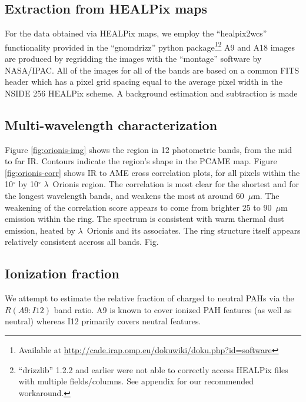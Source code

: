 		\subsection{Extraction from HEALPix maps}
		  For the data obtained via HEALPix maps, we employ the ``healpix2wcs'' functionality provided in the ``gnomdrizz'' python package\footnote{Available at \url{http://cade.irap.omp.eu/dokuwiki/doku.php?id=software}}\footnote{``drizzlib'' 1.2.2 and earlier were not able to correctly access HEALPix files with multiple fields/columns. See appendix for our recommended workaround.} A9 and A18 images are produced by regridding the images with the ``montage'' software by NASA/IPAC. All of the images for all of the bands are based on a common FITS header which has a pixel grid spacing equal to the average pixel width in the NSIDE 256 HEALPix scheme.
      A background estimation and subtraction is made

		\subsection{Multi-wavelength characterization}
			Figure \ref{fig:orionis-img} shows the region in 12 photometric bands, from the mid to far IR. Contours indicate the region's shape in the PCAME map. Figure \ref{fig:orionis-corr} shows IR to AME cross correlation plots, for all pixels within the 10$^{\circ}$ by 10$^{\circ}$ $\lambda$~Orionis region. The correlation is most clear for the shortest and for the longest wavelength bands, and weakens the most at around 60~$\mu$m. The weakening of the correlation score appears to come from brighter 25 to 90~$\mu$m emission within the ring. The spectrum is consistent with warm thermal dust emission, heated by $\lambda$~Orionis and its associates. The ring structure itself appears relatively consistent accross all bands. Fig. \

		\subsection{Ionization fraction}
			We attempt to estimate the relative fraction of charged to neutral PAHs via the $R(A9:I12)$ band ratio. A9 is known to cover ionized PAH features (as well as neutral) whereas I12 primarily covers neutral features.


